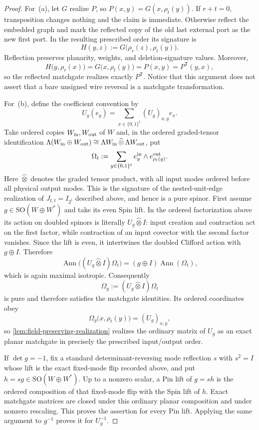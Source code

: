 \documentclass[11pt]{article}
\theoremstyle{definition}
\theoremstyle{remark}
\newcommand{\bits}{\{0,1\}}
\newcommand{\trans}{\mathsf T}
\newcommand{\Ann}{\operatorname{Ann}}
\begin{document}
\begin{proof}
For~\textup{(a)}, let $G$ realize $P$, so
$P(x,y)=G(x,\rho_t(y))$.  If $r+t=0$, transposition changes nothing and the
claim is immediate.  Otherwise reflect the embedded graph and mark the reflected
copy of the old last external port as the new first port.  In the resulting
prescribed order its signature is
\[
  H(y,z):=G\bigl(\rho_r(z),\rho_t(y)\bigr).
\]
Reflection preserves planarity, weights, and deletion-signature values.
Moreover,
\[
  H\bigl(y,\rho_r(x)\bigr)
  =G\bigl(x,\rho_t(y)\bigr)=P(x,y)=P^{\trans}(y,x),
\]
so the reflected matchgate realizes exactly $P^{\trans}$.  Notice that this
argument does not assert that a bare unsigned wire reversal is a matchgate
transformation.

For~\textup{(b)}, define the coefficient convention by
\[
  U_g(e_y)=\sum_{x\in\bits^t}(U_g)_{x,y}e_x.
\]
Take ordered copies $W_{\rm in},W_{\rm out}$ of $W$ and, in the ordered
graded-tensor identification
$\Lambda(W_{\rm in}\oplus W_{\rm out})
 \cong\Lambda W_{\rm in}\,\widehat\otimes\,\Lambda W_{\rm out}$, put
\[
  \Omega_t:=\sum_{y\in\bits^t}
       e_y^{\rm in}\wedge e_{\rho_t(y)}^{\rm out}.
\]
Here $\widehat\otimes$ denotes the graded tensor product, with all input
modes ordered before all physical output modes.
This is the signature of the nested-unit-edge realization of
$J_{t,t}=I_{2^t}$ described above, and hence is a pure spinor.  First assume
$g\in \mathrm{SO}(W\oplus W^*)$ and take its even Spin lift.  In the ordered
factorization above its action on doubled spinors is literally
$U_g\widehat\otimes I$: input creation and contraction act on the first
factor, while contraction of an input covector with the second factor
vanishes.  Since the lift is even, it intertwines the doubled Clifford
action with $g\oplus I$.  Therefore
\[
  \Ann\bigl((U_g\widehat\otimes I)\Omega_t\bigr)
  =(g\oplus I)\Ann(\Omega_t),
\]
which is again maximal isotropic.  Consequently
\[
  \Omega_g:=(U_g\widehat\otimes I)\Omega_t
\]
is pure and therefore satisfies the matchgate identities.  Its ordered
coordinates obey
\[
  \Omega_g\bigl(x,\rho_t(y)\bigr)=(U_g)_{x,y},
\]
so \cref{lem:field-preserving-realization} realizes the ordinary matrix of
$U_g$ as an exact planar matchgate in precisely the prescribed input/output
order.

If $\det g=-1$, fix a standard determinant-reversing mode reflection $s$
with $s^2=I$
whose lift is the exact fixed-mode flip recorded above, and put $h=sg\in
\mathrm{SO}(W\oplus W^*)$.  Up to a nonzero scalar, a Pin lift of $g=s h$ is the
ordered composition of that fixed-mode flip with the Spin lift of $h$.
Exact matchgate matrices are closed under this ordinary planar composition
and under nonzero rescaling.  This proves the assertion for every Pin lift.
Applying the same argument to $g^{-1}$ proves it for $U_g^{-1}$.
\end{proof}
\end{document}
